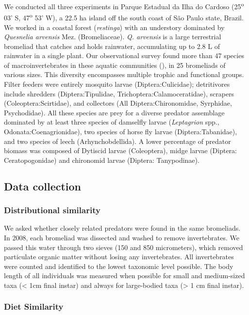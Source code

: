 \documentclass[11pt]{article}
\begin{document}
We conducted all three experiments in Parque Estadual da Ilha do Cardoso
(25\textsuperscript{o} 03' S, 47\textsuperscript{o} 53' W), a 22.5 ha
island off the south coast of S\~ao Paulo state, Brazil. We worked in a
coastal forest (\emph{restinga}) with an understory dominated by
\emph{Quesnelia arvensis} Mez. (Bromeliaceae). \emph{Q. arvensis} is a
large terrestrial bromeliad that catches and holds rainwater, accumulating up to 2.8 L of rainwater in a single plant.
Our observational survey found more than 47 species of
macroinvertebrates in these aquatic communities (\citealt{Romero2010}), in
25 bromeliads of various sizes. This diversity encompasses multiple
trophic and functional groups. Filter feeders were entirely mosquito
larvae (Diptera:Culicidae); detritivores include shredders
(Diptera:Tipulidae, Trichoptera:Calamoceratidae), scrapers
(Coleoptera:Scirtidae), and collectors (All Diptera:Chironomidae,
Syrphidae, Psychodidae). All these species are prey for a diverse
predator assemblage dominated by at least three species of damselfly
larvae (\emph{Leptagrion} spp., Odonata:Coenagrionidae), two species of
horse fly larvae (Diptera:Tabanidae), and two species of leech
(Arhynchobdellida). A lower percentage of predator biomass was composed
of Dytiscid larvae (Coleoptera), midge larvae (Diptera: Ceratopogonidae)
and chironomid larvae (Diptera: Tanypodinae).

\subsection*{Data collection}\label{data-collection}

\subsubsection*{Distributional similarity}

We asked whether closely related predators were found in the same
bromeliads. In 2008, each bromeliad was dissected and washed to remove
invertebrates. We passed this water through two sieves (150 and 850 micrometers),
which removed particulate organic matter without losing any
invertebrates. All invertebrates were counted and identified to the
lowest taxonomic level possible. The body length of all individuals was
measured when possible for small and medium-sized taxa (\textless{} 1cm
final instar) and always for large-bodied taxa (\textgreater{} 1 cm
final instar).

\subsubsection*{Diet Similarity}
\end{document}
